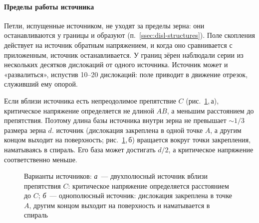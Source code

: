 \paragraph{Пределы работы источника}
Петли, испущенные источником, не уходят за пределы зерна: они
останавливаются у границы и образуют 
(п.~\ref{ssec:disl-structures}). Поле скопления действует на источник
обратным напряжением, и когда оно сравнивается с приложенным, источник
останавливается. У границ зёрен наблюдали серии из нескольких десятков
дислокаций от одного источника. Источник может и «развалиться», испустив
10--20 дислокаций: поле приводит в движение отрезок, служивший ему
опорой.

Если вблизи источника есть непреодолимое препятствие $C$
(рис.~\ref{fig:FR-variants},\,а), критическое напряжение определяется не
длиной $AB$, а меньшим расстоянием до препятствия. Поэтому длина базы
источника внутри зерна не превышает $\sim1/3$ размера зерна $d$.
 источник (дислокация закреплена в одной точке $A$, а
другим концом выходит на поверхность; рис.~\ref{fig:FR-variants},\,б)
вращается вокруг точки закрепления, наматываясь в спираль. Его база может
достигать $d/2$, а критическое напряжение соответственно меньше.

\begin{figure}[ht]
\centering
\begin{subfigure}[b]{0.42\textwidth}\centering
{}
\caption{}
\end{subfigure}\hfill
\begin{subfigure}[b]{0.42\textwidth}\centering
{}
\caption{}
\end{subfigure}
\caption{Варианты источников: \textit{а}~— двухполюсный источник вблизи
препятствия $C$: критическое напряжение определяется расстоянием до $C$;
\textit{б}~— однополюсный источник: дислокация закреплена в точке $A$,
другим концом выходит на поверхность и наматывается в спираль}
\label{fig:FR-variants}
\end{figure}

